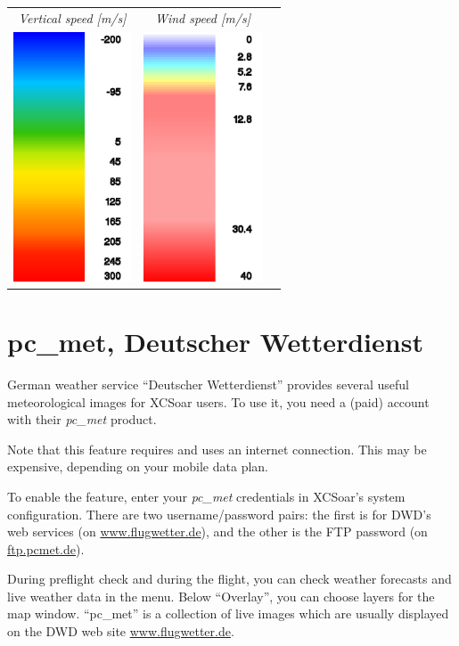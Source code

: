 \begin{maxipage}
\begin{longtable}{c c c}
\\
\emph{Vertical speed [m/s]} & \emph{Wind speed [m/s]} & \\
\includegraphics[angle=0,width=3.5cm,keepaspectratio='true']{figures/ramp-rasp-vertspeed.png} &
\includegraphics[angle=0,width=3.5cm,keepaspectratio='true']{figures/ramp-rasp-windspeed.png} & \\

\end{longtable}
\end{maxipage}

\section{pc\_met, Deutscher Wetterdienst}\label{sec:pcmet}

German weather service ``Deutscher Wetterdienst'' provides several
useful meteorological images for XCSoar users.  To use it, you need a
(paid) account with their \emph{pc\_met} product.

Note that this feature requires and uses an internet connection.  This
may be expensive, depending on your mobile data plan.

To enable the feature, enter your \emph{pc\_met} credentials in
XCSoar's system configuration.  There are two username/password pairs:
the first is for DWD's web services (on \url{www.flugwetter.de}),
and the other is the FTP password (on \url{ftp.pcmet.de}).

During preflight check and during the flight, you can check weather
forecasts and live weather data in the
  menu.
Below ``Overlay'', you can choose layers for the map window.
``pc\_met'' is a collection of live images which are usually displayed
on the DWD web site \url{www.flugwetter.de}.
